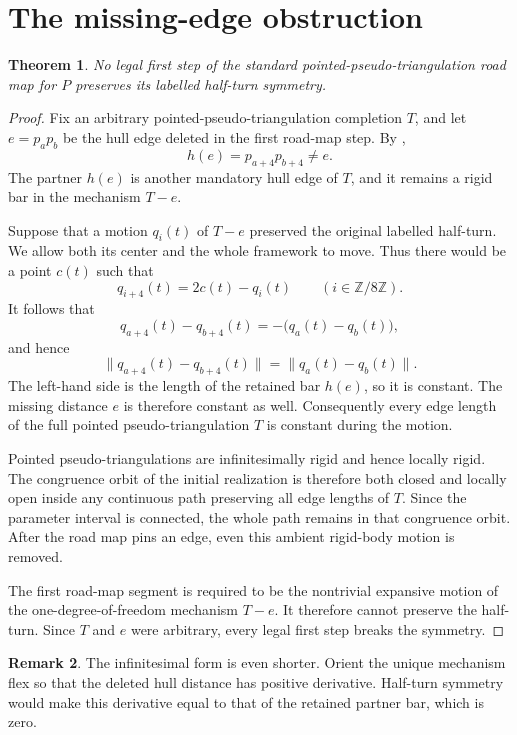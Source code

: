 \documentclass[10pt,reqno]{amsart}
\newtheorem{theorem}{Theorem}[section]
\theoremstyle{definition}
\newtheorem{remark}[theorem]{Remark}
\begin{document}
\section{The missing-edge obstruction}

\begin{theorem}\label{thm:main}
No legal first step of the standard pointed-pseudo-triangulation road map
for \(P\) preserves its labelled half-turn symmetry.
\end{theorem}

\begin{proof}
Fix an arbitrary pointed-pseudo-triangulation completion \(T\), and let
\(e=p_ap_b\) be the hull edge deleted in the first road-map step.  By
,
\[
 h(e)=p_{a+4}p_{b+4}\neq e.
\]
The partner \(h(e)\) is another mandatory hull edge of \(T\), and it remains
a rigid bar in the mechanism \(T-e\).

Suppose that a motion \(q_i(t)\) of \(T-e\) preserved the original labelled
half-turn.  We allow both its center and the whole framework to move.  Thus
there would be a point \(c(t)\) such that
\[
 q_{i+4}(t)=2c(t)-q_i(t)
 \qquad(i\in\mathbb Z/8\mathbb Z).
\]
It follows that
\[
 q_{a+4}(t)-q_{b+4}(t)
 =-\bigl(q_a(t)-q_b(t)\bigr),
\]
and hence
\[
 \lVert q_{a+4}(t)-q_{b+4}(t)\rVert
 =\lVert q_a(t)-q_b(t)\rVert.
\]
The left-hand side is the length of the retained bar \(h(e)\), so it is
constant.  The missing distance \(e\) is therefore constant as well.
Consequently every edge length of the full pointed pseudo-triangulation
\(T\) is constant during the motion.

Pointed pseudo-triangulations are infinitesimally rigid and hence locally
rigid.  The congruence orbit of the initial realization is therefore both
closed and locally open inside any continuous path preserving all edge
lengths of \(T\).  Since the parameter interval is connected, the whole path
remains in that congruence orbit.  After the road map pins an edge, even this
ambient rigid-body motion is removed.

The first road-map segment is required to be the nontrivial expansive motion
of the one-degree-of-freedom mechanism \(T-e\).  It therefore cannot preserve
the half-turn.  Since \(T\) and \(e\) were arbitrary, every legal first step
breaks the symmetry.
\end{proof}

\begin{remark}
The infinitesimal form is even shorter.  Orient the unique mechanism flex so
that the deleted hull distance has positive derivative.  Half-turn symmetry
would make this derivative equal to that of the retained partner bar, which
is zero.
\end{remark}
\end{document}
